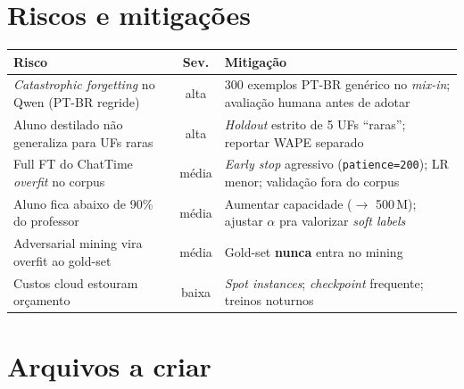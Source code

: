 \documentclass[11pt,a4paper]{article}
\newcommand{\code}[1]{\texttt{\small #1}}
\begin{document}
\section{Riscos e mitigações}

\begin{table}[h!]
\centering
\small
\begin{tabularx}{\textwidth}{@{}l c X@{}}
\toprule
\textbf{Risco} & \textbf{Sev.} & \textbf{Mitigação} \\
\midrule
\emph{Catastrophic forgetting} no Qwen (PT-BR regride) & alta &
300 exemplos PT-BR genérico no \emph{mix-in}; avaliação humana antes de adotar \\
\midrule
Aluno destilado não generaliza para UFs raras & alta &
\emph{Holdout} estrito de 5 UFs ``raras''; reportar WAPE separado \\
\midrule
Full FT do ChatTime \emph{overfit} no corpus & média &
\emph{Early stop} agressivo (\code{patience=200}); LR menor; validação fora do corpus \\
\midrule
Aluno fica abaixo de 90\% do professor & média &
Aumentar capacidade ($\to$ 500\,M); ajustar $\alpha$ pra valorizar \emph{soft labels} \\
\midrule
Adversarial mining vira overfit ao gold-set & média &
Gold-set \textbf{nunca} entra no mining \\
\midrule
Custos cloud estouram orçamento & baixa &
\emph{Spot instances}; \emph{checkpoint} frequente; treinos noturnos \\
\bottomrule
\end{tabularx}
\end{table}

\section{Arquivos a criar}
\end{document}
